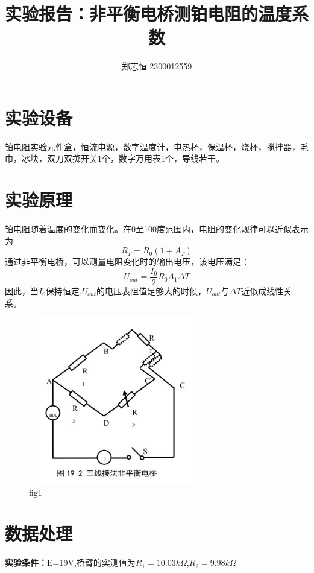 \documentclass[a4paper, 10pt]{article}
\begin{document}
  \title{实验报告：非平衡电桥测铂电阻的温度系数}
  \author{郑志恒 2300012559}
  \maketitle
\section{实验设备}
\noindent 铂电阻实验元件盒，恒流电源，数字温度计，电热杯，保温杯，烧杯，搅拌器，毛巾，冰块，双刀双掷开关1个，数字万用表1个，导线若干。

\section{实验原理}

\noindent 铂电阻随着温度的变化而变化。在0至100度范围内，电阻的变化规律可以近似表示为
$$R_T=R_0(1+A_T)$$
通过非平衡电桥，可以测量电阻变化时的输出电压，该电压满足：
$$U_{out}=\frac{I_0}{2}R_0A_1\Delta T$$
因此，当$I_0$保持恒定,$U_{out}$的电压表阻值足够大的时候，$U_{out}$与$\Delta T$近似成线性关系。

\begin{figure}[ht]
  \centering 
  \includegraphics[height=7.3cm,width=7.5cm]{p2.png}
  
  \caption{fig1}
  \label{4}
  
  \end{figure}

\section{数据处理}

\noindent \textbf{实验条件：}E=19V,桥臂的实测值为$R_1=10.03k\Omega$,$R_2=9.98k\Omega$
\end{document}
